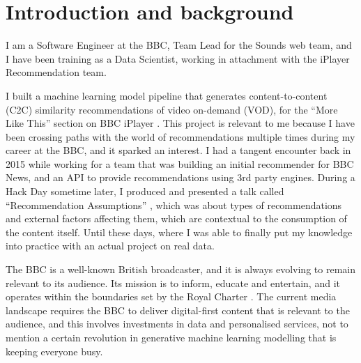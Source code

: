 
\section{Introduction and background}

I am a Software Engineer at the BBC, Team Lead for the Sounds web team, and I have been training as a Data Scientist,
working in attachment with the iPlayer Recommendation team.

I built a machine learning model pipeline that generates content-to-content (C2C) similarity recommendations
of video on-demand (VOD), for the ``More Like This'' section on BBC iPlayer \cite{BBC:MoreLikeBluey}.
This project is relevant to me because I have been crossing paths with the world of recommendations
multiple times during my career at the BBC, and it sparked an interest.
I had a tangent encounter back in 2015 while working for a team that was building
an initial recommender for BBC News, and an API to provide recommendations using 3rd party engines.
During a Hack Day sometime later, I produced and presented a talk called
``Recommendation Assumptions'' \cite{RecsAssumptions}, which was about types of recommendations and external factors affecting
them, which are contextual to the consumption of the content itself. Until these days, where I was able to finally put my knowledge into practice
with an actual project on real data.

The BBC is a well-known British broadcaster, and it is always evolving to remain relevant to its audience. Its mission
is to inform, educate and entertain, and it operates within the boundaries set by the Royal Charter \cite{BBC:RoyalCharter}.
The current media landscape requires the BBC to deliver digital-first content that is relevant to the audience,
and this involves investments in data and personalised services, not to mention a certain revolution in
generative machine learning modelling that is keeping everyone busy.
